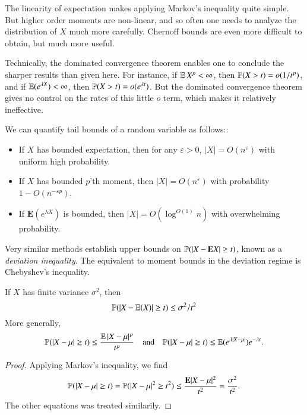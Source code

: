 \begin{remark}
    The linearity of expectation makes applying Markov's inequality quite simple. But higher order moments are non-linear, and so often one needs to analyze the distribution of $X$ much more carefully. Chernoff bounds are even more difficult to obtain, but much more useful.
\end{remark}

\begin{remark}
    Technically, the dominated convergence theorem enables one to conclude the sharper results than given here. For instance, if $\operatorname{\mathbb{E}} X^p < \infty$, then $\mathbb{P}(X > t) = o(1/t^p)$, and if $\operatorname{\mathbb{E}}(e^{\lambda X}) < \infty$, then $\mathbb{P}(X > t) = o(e^{\lambda t})$. But the dominated convergence theorem gives no control on the rates of this little $o$ term, which makes it relatively ineffective.
\end{remark}

We can quantify tail bounds of a random variable as follows::
%
\begin{itemize}
    \item If $X$ has bounded expectation, then for any $\varepsilon > 0$, $|X| = O(n^\varepsilon)$ with uniform high probability.

    \item If $X$ has bounded $p$'th moment, then $|X| = O(n^\varepsilon)$ with probability $1 - O(n^{-\varepsilon p})$.

    \item If $\mathbf{E}(e^{\lambda X})$ is bounded, then $|X| = O(\log^{O(1)} n)$ with overwhelming probability.
\end{itemize}
%
Very similar methods establish upper bounds on $\operatorname{\mathbb{P}}(|X - \mathbf{E} X| \geq t)$, known as a \emph{deviation inequality}. The equivalent to moment bounds in the deviation regime is Chebyshev's inequality.

\begin{theorem}
    If $X$ has finite variance $\sigma^2$, then
    \[ \mathbb{P}(|X - \operatorname{\mathbb{E}}(X)| \geq t) \leq \sigma^2 / t^2 \]
    More generally,
    \[ \mathbb{P}(|X - \mu| \geq t) \leq \frac{\operatorname{\mathbb{E}} |X - \mu|^p}{t^p} \quad \text{and} \quad \mathbb{P}(|X-\mu| \geq t) \leq \operatorname{\mathbb{E}}(e^{\lambda |X - \mu|}) e^{- \lambda t}. \]
\end{theorem}
\begin{proof}
    Applying Markov's inequality, we find
    \[ \mathbb{P}(|X - \mu| \geq t) = \mathbb{P}(|X - \mu|^2 \geq t^2) \leq \frac{\mathbf{E}|X - \mu|^2}{t^2} = \frac{\sigma^2}{t^2}. \]
    The other equations was treated similarily.
\end{proof}

